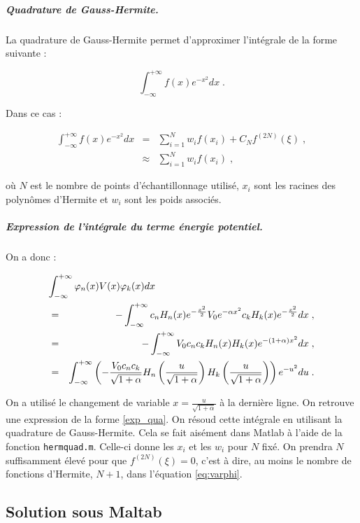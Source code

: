 \documentclass{report}
\begin{document}
\subparagraph{Quadrature de Gauss-Hermite.}

La quadrature de Gauss-Hermite permet d'approximer l'intégrale de la forme suivante :

\begin{equation}\label{exp_qua}
\int_{-\infty}^{+\infty} f(x) e^{-x^{2}} dx\;.
\end{equation}

Dans ce cas :

\begin{eqnarray}
\int_{-\infty}^{+\infty} f(x) e^{-x^{2}} dx & = & \sum_{i=1}^N w_i f(x_i)+C_{N}f^{(2N)}(\xi) \;,\\
& \approx & \sum_{i=1}^N w_i f(x_i)\;,
\end{eqnarray}

où $N$ est le nombre de points d'échantillonnage utilisé, $x_i$ sont les racines des polynômes d'Hermite et $w_i$ sont les poids associés.

\subparagraph{Expression de l'intégrale du terme énergie potentiel.}

On a donc :

\begin{eqnarray}
\lefteqn{\int_{-\infty}^{+\infty} \varphi_n(x) V(x) \varphi_k(x) dx }\\
&=& - \int_{-\infty}^{+\infty} c_{n} H_{n}(x)e^{-\frac{x^{2}}{2}} V_{0}e^{-\alpha x^{2}} c_{k} H_{k}(x)e^{-\frac{x^{2}}{2}} dx\;,\\
 &=& - \int_{-\infty}^{+\infty} V_{0} c_{n} c_{k} H_{n}(x) H_{k}(x) e^{-\left(1+\alpha \right)x^{2}} dx\;,\\
 &=&  \int_{-\infty}^{+\infty} \left( - \frac{V_{0} c_{n} c_{k}}{\sqrt{1+\alpha}} H_{n}\left(\frac{u}{\sqrt{1+\alpha}}\right) H_{k}\left(\frac{u}{\sqrt{1+\alpha}}\right) \right) e^{-u^{2}} du\;.
\end{eqnarray}

On a utilisé le changement de variable $x = \frac{u}{\sqrt{1+\alpha}}$ à la dernière ligne. On retrouve une expression de la forme \eqref{exp_qua}. On résoud cette intégrale en utilisant la quadrature de Gauss-Hermite. Cela se fait aisément dans Matlab à l'aide de la fonction \texttt{hermquad.m}. Celle-ci donne les $x_i$ et les $w_i$ pour $N$ fixé. On prendra $N$ suffisamment élevé pour que $f^{(2N)}(\xi) = 0$, c'est à dire, au moins le nombre de fonctions d'Hermite, $N+1$, dans l'équation \eqref{eq:varphi}. 

\subsection{Solution sous Maltab}
\end{document}
